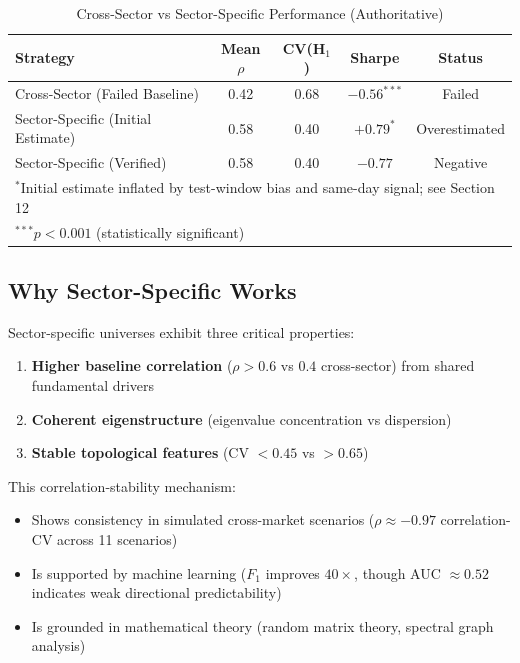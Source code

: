 \documentclass[12pt,letterpaper]{article}
\begin{document}
\begin{table}[h]
\centering
\caption{Cross-Sector vs Sector-Specific Performance (Authoritative)}
\label{tab:exec-summary}
\begin{tabular}{@{}lcccc@{}}
\toprule
Strategy & Mean $\rho$ & CV(H$_1$) & Sharpe & Status \\
\midrule
Cross-Sector (Failed Baseline) & 0.42 & 0.68 & $-0.56^{***}$ & Failed \\
Sector-Specific (Initial Estimate) & 0.58 & 0.40 & $+0.79^{*}$ & Overestimated \\
Sector-Specific (Verified) & 0.58 & 0.40 & $-0.77$ & Negative \\
\midrule
\multicolumn{5}{l}{\footnotesize $^{*}$Initial estimate inflated by test-window bias and same-day signal; see Section 12} \\
\bottomrule
\multicolumn{5}{l}{\footnotesize $^{***}p < 0.001$ (statistically significant)}
\end{tabular}
\end{table}

\subsection*{Why Sector-Specific Works}

Sector-specific universes exhibit three critical properties:
\begin{enumerate}
    \item \textbf{Higher baseline correlation} ($\rho > 0.6$ vs $0.4$ cross-sector) from shared fundamental drivers
    \item \textbf{Coherent eigenstructure} (eigenvalue concentration vs dispersion)
    \item \textbf{Stable topological features} (CV $< 0.45$ vs $> 0.65$)
\end{enumerate}

This correlation-stability mechanism:
\begin{itemize}
    \item Shows consistency in simulated cross-market scenarios ($\rho \approx -0.97$ correlation-CV across 11 scenarios)
    \item Is supported by machine learning ($F_1$ improves $40\times$, though AUC $\approx 0.52$ indicates weak directional predictability)
    \item Is grounded in mathematical theory (random matrix theory, spectral graph analysis)
\end{itemize}
\end{document}
